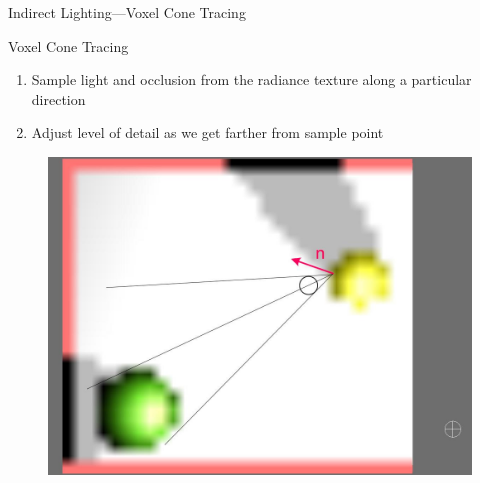\documentclass[10pt]{beamer}
\begin{document}


{
\begin{frame}{Indirect Lighting---Voxel Cone Tracing}
      \begin{block}{Voxel Cone Tracing}
        \begin{enumerate}
          \item Sample light and occlusion from the radiance texture along a particular direction
          \item Adjust level of detail as we get farther from sample point
        \end{enumerate}
      \end{block}

      \begin{figure}
        \includegraphics[height=0.5\textheight]{conetrace2}
      \end{figure}
\end{frame}}
\end{document}
